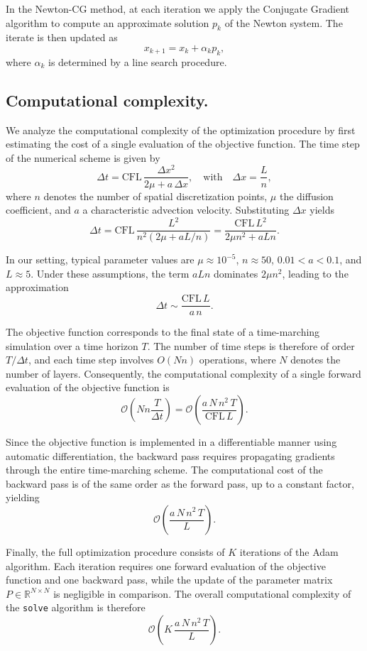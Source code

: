 \documentclass{article}
\begin{document}
In the Newton-CG method, at each iteration we apply the Conjugate Gradient algorithm to compute an approximate solution $p_k$ of the Newton system. 
The iterate is then updated as
\[
x_{k+1} = x_k + \alpha_k p_k,
\]
where $\alpha_k$ is determined by a line search procedure.
\subsection{Computational complexity.}

We analyze the computational complexity of the optimization procedure by first estimating the cost of a single evaluation of the objective function. The time step of the numerical scheme is given by
\[
\Delta t = \mathrm{CFL}\,\frac{\Delta x^2}{2\mu + a\,\Delta x},
\quad \text{with} \quad \Delta x = \frac{L}{n},
\]
where $n$ denotes the number of spatial discretization points, $\mu$ the diffusion coefficient, and $a$ a characteristic advection velocity. Substituting $\Delta x$ yields
\[
\Delta t
= \mathrm{CFL}\,\frac{L^2}{n^2(2\mu + aL/n)}
= \frac{\mathrm{CFL}\,L^2}{2\mu n^2 + aLn}.
\]

In our setting, typical parameter values are $\mu \approx 10^{-5}$, $n \approx 50$, $0.01 < a < 0.1$, and $L \approx 5$. Under these assumptions, the term $aLn$ dominates $2\mu n^2$, leading to the approximation
\[
\Delta t \sim \frac{\mathrm{CFL}\,L}{a\,n}.
\]

The objective function corresponds to the final state of a time-marching simulation over a time horizon $T$. The number of time steps is therefore of order $T / \Delta t$, and each time step involves $O(Nn)$ operations, where $N$ denotes the number of layers. Consequently, the computational complexity of a single forward evaluation of the objective function is
\[
\mathcal{O}\!\left( Nn \frac{T}{\Delta t} \right)
= \mathcal{O}\!\left( \frac{a\,N\,n^2\,T}{\mathrm{CFL}\,L} \right).
\]

Since the objective function is implemented in a differentiable manner using automatic differentiation, the backward pass requires propagating gradients through the entire time-marching scheme. The computational cost of the backward pass is of the same order as the forward pass, up to a constant factor, yielding
\[
\mathcal{O}\!\left( \frac{a\,N\,n^2\,T}{L} \right).
\]

Finally, the full optimization procedure consists of $K$ iterations of the Adam algorithm. Each iteration requires one forward evaluation of the objective function and one backward pass, while the update of the parameter matrix $P \in \mathbb{R}^{N \times N}$ is negligible in comparison. The overall computational complexity of the \texttt{solve} algorithm is therefore
\[
\mathcal{O}\!\left( K\,\frac{a\,N\,n^2\,T}{L} \right).
\]
\end{document}
